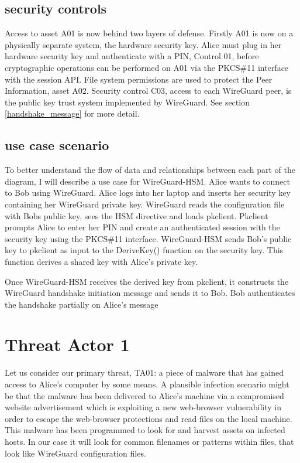 \documentclass [11pt, proquest] {uwthesis}[2020/02/24]
\begin{document}
\subsection{security controls}
Access to asset A01 is now behind two layers of defense. Firstly A01 is now on a physically separate system, the hardware security key. Alice must plug in her hardware security key and authenticate with a PIN, Control 01, before cryptographic operations can be performed on A01 via the PKCS\#11 interface with the session API.
File system permissions are used to protect the Peer Information, asset A02.
Security control C03, access to each WireGuard peer, is the public key trust system implemented by WireGuard. See section \ref{handshake_message} for more detail.

\subsection{use case scenario}
To better understand the flow of data and relationships between each part of the diagram, I will describe a use case for WireGuard-HSM.
Alice wants to connect to Bob using WireGuard. Alice logs into her laptop and inserts her security key containing her WireGuard private key. WireGuard reads the configuration file with Bobs public key, sees the HSM directive and loads pkclient. Pkclient prompts Alice to enter her PIN and create an authenticated session with the security key using the PKCS\#11 interface. WireGuard-HSM sends Bob's public key to pkclient as input to the DeriveKey() function on the security key. This function derives a shared key with Alice's private key.

Once WireGuard-HSM receives the derived key from pkclient, it constructs the WireGuard handshake initiation message and sends it to Bob. Bob authenticates the handshake partially on Alice's message

\section{Threat Actor 1}
Let us consider our primary threat, TA01: a piece of malware that has gained access to Alice's computer by some means. A plausible infection scenario might be that the malware has been delivered to Alice's machine via a compromised website advertisement which is exploiting a new web-browser vulnerability in order to escape the web-browser protections and read files on the local machine.  This malware has been programmed to look for and harvest assets on infected hosts. In our case it will look for common filenames or patterns within files, that look like WireGuard configuration files.  
\end{document}
